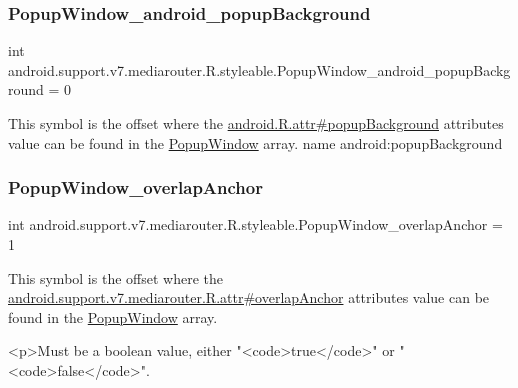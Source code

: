 \subsubsection{\texorpdfstring{Popup\+Window\+\_\+android\+\_\+popup\+Background}{PopupWindow\_android\_popupBackground}}
{\footnotesize\ttfamily int android.\+support.\+v7.\+mediarouter.\+R.\+styleable.\+Popup\+Window\+\_\+android\+\_\+popup\+Background = 0\hspace{0.3cm}{\ttfamily [static]}}

This symbol is the offset where the \hyperlink{}{android.\+R.\+attr\#popup\+Background} attribute\textquotesingle{}s value can be found in the \hyperlink{classandroid_1_1support_1_1v7_1_1mediarouter_1_1R_1_1styleable_a9b218bd30c0404b44b45f04537f6bcb7}{Popup\+Window} array.  name android\+:popup\+Background \mbox{\label{classandroid_1_1support_1_1v7_1_1mediarouter_1_1R_1_1styleable_ad87542b0d9c886bff1bf83a1eaa6ffab}} 
\subsubsection{\texorpdfstring{Popup\+Window\+\_\+overlap\+Anchor}{PopupWindow\_overlapAnchor}}
{\footnotesize\ttfamily int android.\+support.\+v7.\+mediarouter.\+R.\+styleable.\+Popup\+Window\+\_\+overlap\+Anchor = 1\hspace{0.3cm}{\ttfamily [static]}}

This symbol is the offset where the \hyperlink{classandroid_1_1support_1_1v7_1_1mediarouter_1_1R_1_1attr_ac3121877d0453524ba0e96b87e36ad98}{android.\+support.\+v7.\+mediarouter.\+R.\+attr\#overlap\+Anchor} attribute\textquotesingle{}s value can be found in the \hyperlink{classandroid_1_1support_1_1v7_1_1mediarouter_1_1R_1_1styleable_a9b218bd30c0404b44b45f04537f6bcb7}{Popup\+Window} array.

\begin{DoxyVerb}      <p>Must be a boolean value, either "<code>true</code>" or "<code>false</code>".
\end{DoxyVerb}
 

